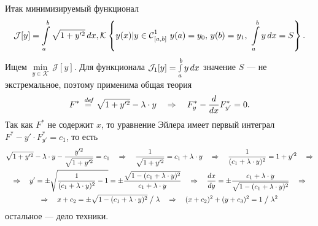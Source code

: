 \documentclass[12pt,a4paper,openany,fleqn]{book}
\newcommand {\defeq}{\stackrel{\hspace{0.09 cm}de\!f}{=}}
\newcommand {\eqdef}{\defeq}
\newcommand{\Cf}{\ensuremath{\mathcal{C}}}
\newcommand{\J}{\ensuremath{\mathcal{J}}}
\newcommand{\mc}[1]{\ensuremath{\mathcal{#1}}}
\newcommand{\Cfn}[2][]{\ensuremath{\Cf{\mathstrut}^{#2}_{#1}}}
\newcommand{\der}[2]{\ensuremath{\frac{d#1}{d#2}}}
\newcommand{\K}{\mc{K}}
\theoremstyle{definition}
\begin{document}
Итак минимизируемый функционал
\begin{gather*}
	\J[y]=\int\limits_a^b\sqrt{1+y^{\prime2}}\,dx,
	\K\left\{y(x)|y\in\Cfn[{[a,b]}]{1}\ y(a)=y_0,\,y(b)=y_1,\ \int\limits_a^b y\,dx=S\right\}.
\end{gather*}
Ищем $\min\limits_{y\in\K}\,\J[y]$. Для функционала $\J_1[y]=\smallint\limits_a^b y\,dx$ значение $S$ --- не экстремальное, поэтому применима общая теория
\begin{equation*}
	F^{\ast}\eqdef\sqrt{1+y^{\prime2}}-\lambda\cdot y\quad\Rightarrow\quad F^{\ast}_{y}-\der{}{x}F^{\ast}_{y'}=0.
\end{equation*}
Так как $F^{\ast}$ не содержит $x$, то уравнение Эйлера имеет первый интеграл $F^{\ast}-y'\cdot F^{\ast}_{y'}=c_1$, то есть
\begin{gather*}
	\sqrt{1+y^{\prime2}}-\lambda\cdot y-\frac{y^{\prime2}}{\sqrt{1+y^{\prime2}}}=c_1\quad\Rightarrow\quad
	\frac{1}{\sqrt{1+y^{\prime2}}}=c_1+\lambda\cdot y\quad\Rightarrow\quad\frac{1}{(c_1+\lambda\cdot y)^2}=1+y^{\prime2}\quad\Rightarrow\\\Rightarrow\quad y'=\pm\sqrt{\frac{1}{(c_1+\lambda\cdot y)^2}-1}=\pm\frac{\sqrt{1-(c_1+\lambda\cdot y)^2}}{c_1+\lambda\cdot y}\quad\Rightarrow\quad\der{x}{y}=\pm\frac{c_1+\lambda\cdot y}{\sqrt{1-(c_1+\lambda\cdot y)^2}}\quad\Rightarrow\\\Rightarrow\quad x+c_2=\pm\sqrt{1-(c_1+\lambda\cdot y)^2}\bigm/\lambda\quad\Rightarrow\quad (x+c_2)^2+(y+c_3)^2=1\bigm/\lambda^2
\end{gather*}
остальное --- дело техники.
\end{document}
